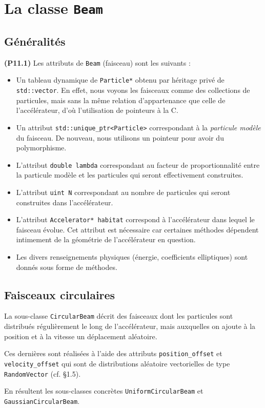 \documentclass[12pt, letterpaper, twoside]{article}
\newcommand{\T}[1]{\texttt{#1}}
\begin{document}
\section{La classe \T{Beam}}
\subsection{Généralités}
\noindent \textbf{(P11.1)} Les attributs de \T{Beam} (faisceau) sont les suivants :
\begin{itemize}
	\item Un tableau dynamique de \T{Particle*} obtenu par héritage privé de \T{std::vector}. En effet, nous voyons les faisceaux comme des collections de particules, mais sans la même relation d'appartenance que celle de l'accélérateur, d'où l'utilisation de pointeurs à la C.
	\item Un attribut \T{std::unique\_ptr<Particle>} correspondant à la \textit{particule modèle} du faisceau. De nouveau, nous utilisons un pointeur pour avoir du polymorphisme.
	\item L'attribut \T{double lambda} correspondant au facteur de proportionnalité entre la particule modèle et les particules qui seront effectivement construites.
	\item L'attribut \T{uint N} correspondant au nombre de particules qui seront construites dans l'accélérateur.
	\item L'attribut \T{Accelerator* habitat} correspond à l'accélérateur dans lequel le faisceau évolue. Cet attribut est nécessaire car certaines méthodes dépendent intimement de la géométrie de l'accélérateur en question.
	\item Les divers renseignements physiques (énergie, coefficients elliptiques) sont donnés sous forme de méthodes.
\end{itemize}

\subsection{Faisceaux circulaires}
\noindent La sous-classe \T{CircularBeam} décrit des faisceaux dont les particules sont distribués régulièrement le long de l'accélérateur, mais auxquelles on ajoute à la position et à la vitesse un déplacement aléatoire.

Ces dernières sont réalisées à l'aide des attributs \T{position\_offset} et \T{velocity\_offset} qui sont de distributions aléatoire vectorielles de type \T{RandomVector} (cf. \S1.5).

En résultent les sous-classes concrètes \T{UniformCircularBeam} et \T{GaussianCircularBeam}.
\end{document}
